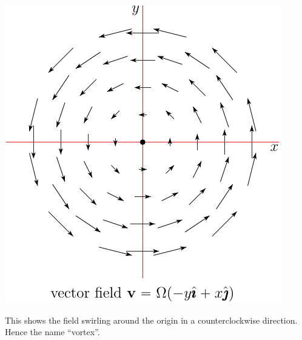 \begin{eg}
\begin{fig}
\begin{center}
    \includegraphics{vortexField.pdf}
\end{center}
\end{fig}
\noindent
This shows the field swirling around the origin in a counterclockwise direction.
Hence the name ``vortex''.
\end{eg}



